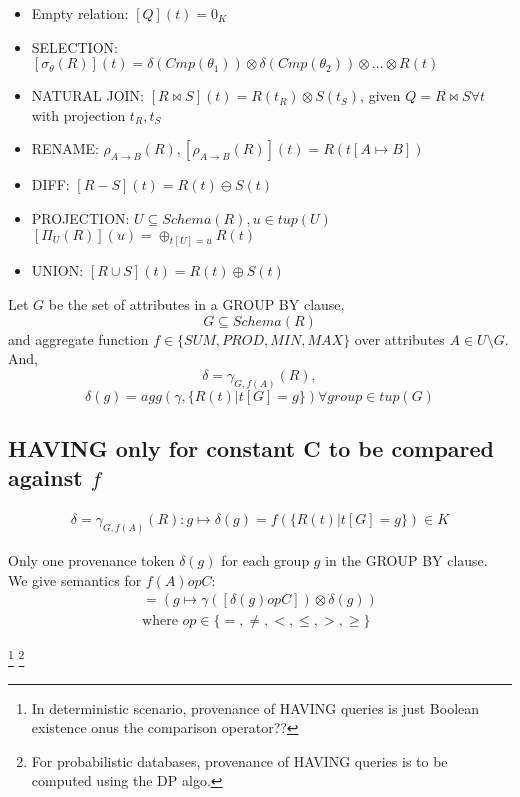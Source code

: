 \documentclass{article}
\begin{document}
\begin{itemize}
  \item Empty relation: $[Q](t) = 0_K$
  \item SELECTION: $[\sigma_{\theta}(R)](t) = \delta(Cmp(\theta_1)) \otimes \delta(Cmp(\theta_2))\otimes \dots \otimes R(t)$
  \item NATURAL JOIN: $[R \bowtie S](t) = R(t_R) \otimes S(t_S)$, given $Q = R \bowtie S \forall t$ with projection $t_R, t_S$
  \item RENAME: $\rho_{A\rightarrow B}(R), [\rho_{A\rightarrow B} (R)](t) = R(t[A \mapsto B])$
  \item DIFF: $[R - S](t) = R(t) \ominus S(t)$
  \item PROJECTION: $U \subseteq Schema(R), u\in tup(U)$\\
  $[\Pi_U(R)](u) = \oplus_{t[U] = u} R(t)$\\
  \item UNION: $[R \cup S](t) = R(t) \oplus S(t)$
\end{itemize}

Let $G$ be the set of attributes in a GROUP BY clause,
$$G \subseteq Schema(R)$$
and aggregate function $f\in\{SUM, PROD, MIN, MAX\}$ over attributes $A\in U\setminus G$.\\
And, $$\delta = \gamma_{G,f(A)}(R),$$
$$\delta(g) = agg(\gamma, \{R(t) | t[G] = g\}) \forall group \in tup(G)$$

\subsection{HAVING only for constant C to be compared against $f$}
\begin{align*}
  \delta = \gamma_{G,f(A)}(R): g \mapsto \delta(g) = f(\{R(t)|t[G] = g\})\in K
\end{align*}

Only one provenance token $\delta(g)$ for each group $g$ in the GROUP BY clause.\\
We give semantics for $f(A) op C$:
\begin{align*}
  [\gamma_{G,f(A)}(R) \text{ HAVING } f(A) op C] = (g \mapsto \gamma ([\delta(g) op C])\otimes \delta(g))\\
  \text{where } op \in \{=, \neq, <, \leq, >, \geq\}
\end{align*}

\footnote{In deterministic scenario, provenance of HAVING queries is just Boolean existence onus the comparison operator??}
\footnote{For probabilistic databases, provenance of HAVING queries is to be computed using the DP algo.}


\end{document}
